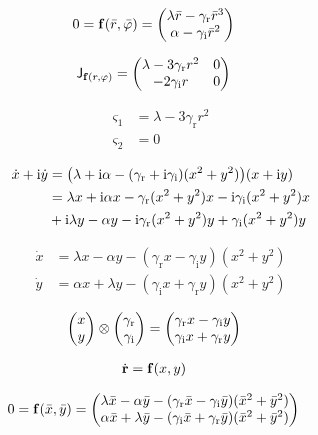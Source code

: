 \documentclass[a4paper,10pt]{article}
\newcommand{\mi}{\mathrm{i}}
\newcommand{\gammar}{\gamma_{\text{r}}}
\newcommand{\gammai}{\gamma_{\text{i}}}
\begin{document}
\begin{align}
	0
	&=
	\vb{f}
	(\bar{r},\bar{\varphi})
	=
	\pmqty{
		\lambda \bar{r}
		-
		\gammar
		\bar{r}^3
	\\
		\alpha
		-
		\gammai
		\bar{r}^2
	}
\end{align}

\begin{align}
	\mathsf{J}_{\vb{f}(r,\varphi)}
	&=
	\pmqty{
		\lambda-3\gammar r^2
		&
		0
		\\
		-2\gammai r
		&
		0
	}
\end{align}

\begin{align}
	\varsigma_1
	&=
	\lambda-3\gammar r^2
\\
	\varsigma_2
	&=
	0
\end{align}

\begin{align}
	\dot{x}
	+
	\mi\dot{y}
	&=
	\pqty{
		\lambda
		+
		\mi\alpha
		-
		(
			\gammar
			+
			\mi\gammai		
		)
		(x^2+y^2)
	}
	\pqty{
		x
		+
		\mi y
	}
\\
	&=
	\lambda
	x
	+
	\mi\alpha
	x		
	-
	\gammar
	(x^2+y^2)		
	x		
	-
	\mi\gammai		
	(x^2+y^2)
	x
\\
	&+
	\mi
	\lambda
	y
	-
	\alpha
	y
	-
	\mi
	\gammar
	(x^2+y^2)
	y
	+
	\gammai
	(x^2+y^2)
	y
\end{align}

\begin{align}
	\dot{x}
	&=
	\lambda
	x
	-
	\alpha
	y
	-
	(
		\gammar
		x
		-
		\gammai
		y	
	)
	(x^2+y^2)
\\
	\dot{y}
	&=
	\alpha
	x
	+	
	\lambda
	y		
	-
	(
		\gammai
		x
		+
		\gammar
		y
	)
	(x^2+y^2)
\end{align}

\begin{align}
	\pmqty{
		x\\y	
	}
	\otimes
	\pmqty{
		\gammar\\\gammai	
	}
	&=
	\pmqty{
		\gammar
		x
		-
		\gammai
		y
		\\
		\gammai
		x
		+
		\gammar
		y
	}
\end{align}

\begin{align}
	\dot{\vb{r}}
	&=
	\vb{f}
	(x,y)
\end{align}

\begin{align}
	0
	&=
	\vb{f}
	(\bar{x},\bar{y})
	=
	\pmqty{
		\lambda
		\bar{x}
		-
		\alpha
		\bar{y}
		-
		(
			\gammar
			\bar{x}
			-
			\gammai
			\bar{y}
		)
		(\bar{x}^2+\bar{y}^2)
	\\
		\alpha
		\bar{x}
		+	
		\lambda
		\bar{y}
		-
		(
			\gammai
			\bar{x}
			+
			\gammar
			\bar{y}
		)
		(\bar{x}^2+\bar{y}^2)
	}
\end{align}
\end{document}
